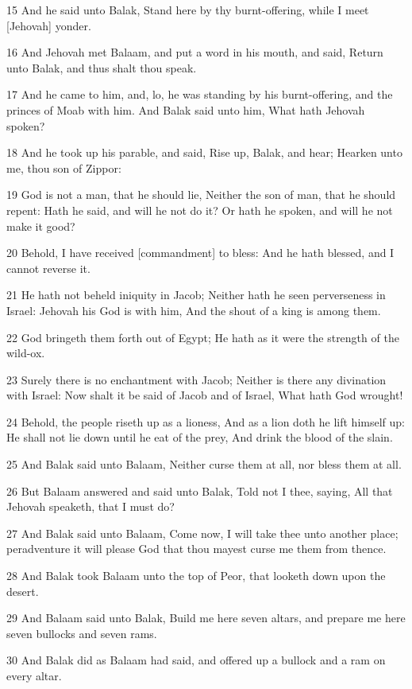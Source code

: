 \par 15 And he said unto Balak, Stand here by thy burnt-offering, while I meet [Jehovah] yonder.
\par 16 And Jehovah met Balaam, and put a word in his mouth, and said, Return unto Balak, and thus shalt thou speak.
\par 17 And he came to him, and, lo, he was standing by his burnt-offering, and the princes of Moab with him. And Balak said unto him, What hath Jehovah spoken?
\par 18 And he took up his parable, and said, Rise up, Balak, and hear; Hearken unto me, thou son of Zippor:
\par 19 God is not a man, that he should lie, Neither the son of man, that he should repent: Hath he said, and will he not do it? Or hath he spoken, and will he not make it good?
\par 20 Behold, I have received [commandment] to bless: And he hath blessed, and I cannot reverse it.
\par 21 He hath not beheld iniquity in Jacob; Neither hath he seen perverseness in Israel: Jehovah his God is with him, And the shout of a king is among them.
\par 22 God bringeth them forth out of Egypt; He hath as it were the strength of the wild-ox.
\par 23 Surely there is no enchantment with Jacob; Neither is there any divination with Israel: Now shalt it be said of Jacob and of Israel, What hath God wrought!
\par 24 Behold, the people riseth up as a lioness, And as a lion doth he lift himself up: He shall not lie down until he eat of the prey, And drink the blood of the slain.
\par 25 And Balak said unto Balaam, Neither curse them at all, nor bless them at all.
\par 26 But Balaam answered and said unto Balak, Told not I thee, saying, All that Jehovah speaketh, that I must do?
\par 27 And Balak said unto Balaam, Come now, I will take thee unto another place; peradventure it will please God that thou mayest curse me them from thence.
\par 28 And Balak took Balaam unto the top of Peor, that looketh down upon the desert.
\par 29 And Balaam said unto Balak, Build me here seven altars, and prepare me here seven bullocks and seven rams.
\par 30 And Balak did as Balaam had said, and offered up a bullock and a ram on every altar.

